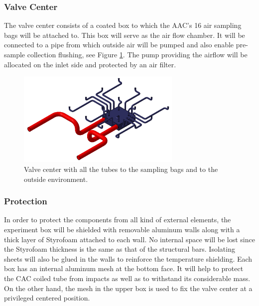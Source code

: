 \subsubsection{Valve Center}

The valve center consists of a coated box to which the AAC's 16 air sampling bags will be attached to. This box will serve as the air flow chamber. It will be connected to a pipe from which outside air will be pumped and also enable pre-sample collection flushing, see Figure \ref{valve_center_and_pipes}. The pump providing the airflow will be allocated on the inlet side and protected by an air filter. 


\begin{figure}[!ht]
    \centering
    \includegraphics[width=0.7\textwidth]{4-experiment-design/img/valve_collector.jpg}
    \caption{Valve center with all the tubes to the sampling bags and to the outside environment.}
    \label{valve_center_and_pipes}
\end{figure}


\subsubsection{Protection}

In order to protect the components from all kind of external elements, the experiment box will be shielded with removable aluminum walls along with a thick layer of Styrofoam attached to each wall. No internal space will be lost since the Styrofoam thickness is the same as that of the structural bars. Isolating sheets will also be glued in the walls to reinforce the temperature shielding. Each box has an internal aluminum mesh at the bottom face. It will help to protect the CAC coiled tube from impacts as well as to withstand its considerable mass. On the other hand, the mesh in the upper box is used to fix the valve center at a privileged centered position.

